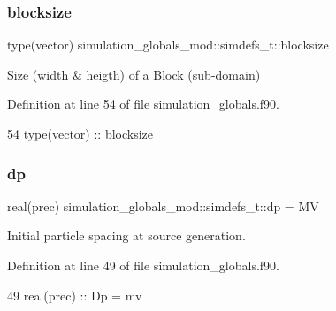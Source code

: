 \subsubsection{\texorpdfstring{blocksize}{blocksize}}
{\footnotesize\ttfamily type(vector) simulation\+\_\+globals\+\_\+mod\+::simdefs\+\_\+t\+::blocksize\hspace{0.3cm}{\ttfamily [private]}}



Size (width \& heigth) of a Block (sub-\/domain) 



Definition at line 54 of file simulation\+\_\+globals.\+f90.


\begin{DoxyCode}
54         \textcolor{keywordtype}{type}(vector)    ::  blocksize
\end{DoxyCode}
\mbox{\label{structsimulation__globals__mod_1_1simdefs__t_af730c363daf57cdb66206b7cc7e3d8ff}} 
\subsubsection{\texorpdfstring{dp}{dp}}
{\footnotesize\ttfamily real(prec) simulation\+\_\+globals\+\_\+mod\+::simdefs\+\_\+t\+::dp = MV\hspace{0.3cm}{\ttfamily [private]}}



Initial particle spacing at source generation. 



Definition at line 49 of file simulation\+\_\+globals.\+f90.


\begin{DoxyCode}
49         \textcolor{keywordtype}{real(prec)}      ::  Dp = mv         
\end{DoxyCode}
\mbox{\label{structsimulation__globals__mod_1_1simdefs__t_acc8df5cd09283215deb732d97b44f1dc}} 
